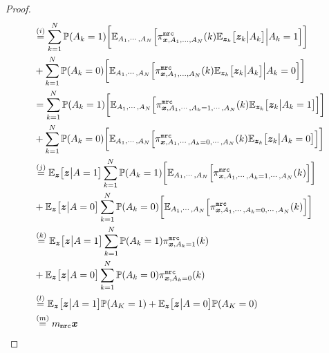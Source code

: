 \begin{proof}
\begin{align}
& \stackrel{(i)}{=} \sum_{k = 1}^{N} \mathbb{P}(A_k = 1) \bigg[\mathbb{E}_{A_1, \cdots,A_N}\Big[ \pi^{\texttt{mrc}}_{{\boldsymbol{x}}, A_1,...,A_N}(k) \mathbb{E}_{{\boldsymbol{z}}_k} \big[ {\boldsymbol{z}}_k  \big| A_k\big] \Big| A_k = 1\Big] \bigg] \\
& + \sum_{k = 1}^{N} \mathbb{P}(A_k = 0) \bigg[\mathbb{E}_{A_1, \cdots,A_N}\Big[ \pi^{\texttt{mrc}}_{{\boldsymbol{x}}, A_1,...,A_N}(k) \mathbb{E}_{{\boldsymbol{z}}_k} \big[ {\boldsymbol{z}}_k  \big| A_k\big] \Big| A_k = 0\Big] \bigg] \\
& = \sum_{k = 1}^{N} \mathbb{P}(A_k = 1) \bigg[\mathbb{E}_{A_1, \cdots,A_N}\Big[\pi^{\texttt{mrc}}_{{\boldsymbol{x}}, A_1, \cdots,A_k = 1, \cdots, A_N}(k) \mathbb{E}_{{\boldsymbol{z}}_k} \big[ {\boldsymbol{z}}_k  \big| A_k = 1\big] \Big] \bigg] \\
&  + \sum_{k = 1}^{N} \mathbb{P}(A_k = 0) \bigg[\mathbb{E}_{A_1, \cdots,A_N}\Big[ \pi^{\texttt{mrc}}_{{\boldsymbol{x}}, A_1, \cdots,A_k = 0, \cdots, A_N}(k) \mathbb{E}_{{\boldsymbol{z}}_k} \big[ {\boldsymbol{z}}_k  \big| A_k = 0\big] \Big] \bigg]\\
& \stackrel{(j)}{=} \mathbb{E}_{{\boldsymbol{z}}}\big[ {\boldsymbol{z}}  \big| A = 1\big]  \sum_{k = 1}^{N} \mathbb{P}(A_k = 1) \bigg[\mathbb{E}_{A_1, \cdots,A_N}\Big[ \pi^{\texttt{mrc}}_{{\boldsymbol{x}}, A_1, \cdots,A_k = 1, \cdots, A_N}(k)  \Big] \bigg] \\
&  + \mathbb{E}_{{\boldsymbol{z}}}\big[ {\boldsymbol{z}}  \big| A = 0\big] \sum_{k = 1}^{N} \mathbb{P}(A_k = 0) \bigg[\mathbb{E}_{A_1, \cdots,A_N}\Big[ \pi^{\texttt{mrc}}_{{\boldsymbol{x}}, A_1, \cdots,A_k = 0, \cdots, A_N}(k) \Big] \bigg]\\
& \stackrel{(k)}{=} \mathbb{E}_{{\boldsymbol{z}}}\big[ {\boldsymbol{z}}  \big| A = 1\big]  \sum_{k = 1}^{N} \mathbb{P}(A_k = 1) \pi^{\texttt{mrc}}_{{\boldsymbol{x}}, A_k = 1}(k) \\
&+  \mathbb{E}_{{\boldsymbol{z}}}\big[ {\boldsymbol{z}}  \big| A = 0\big]  \sum_{k = 1}^{N} \mathbb{P}(A_k = 0) \pi^{\texttt{mrc}}_{{\boldsymbol{x}}, A_k = 0}(k) \\
& \stackrel{(l)}{=} \mathbb{E}_{{\boldsymbol{z}}}\big[ {\boldsymbol{z}}  \big| A = 1\big] \mathbb{P}(A_K = 1) + \mathbb{E}_{{\boldsymbol{z}}}\big[ {\boldsymbol{z}}  \big| A = 0\big] \mathbb{P}(A_K = 0)\\
& \stackrel{(m)}{=} m_\texttt{mrc} {\boldsymbol{x}} \label{eq:miracle_zero_bias}
\end{align}

\end{proof}
